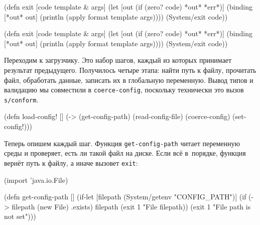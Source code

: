\ifx\DEVICETYPE\MOBILE

\begin{english}
  \begin{clojure}
(defn exit
  [code template & args]
  (let [out (if (zero? code)
              *out*
              *err*)]
    (binding [*out* out]
      (println (apply format
        template args))))
  (System/exit code))
  \end{clojure}
\end{english}

\else

\begin{english}
  \begin{clojure}
(defn exit
  [code template & args]
  (let [out (if (zero? code) *out* *err*)]
    (binding [*out* out]
      (println (apply format template args))))
  (System/exit code))
  \end{clojure}
\end{english}

\fi

Переходим к загрузчику. Это набор шагов, каждый из которых принимает результат
предыдущего. Получилось четыре этапа: найти путь к файлу, прочитать файл,
обработать данные, записать их в глобальную переменную. Вывод типов и валидацию
мы совместили в \verb|coerce-config|, поскольку технически это вызов
\verb|s/conform|.


\begin{english}
  \begin{clojure}
(defn load-config! []
  (-> (get-config-path)
      (read-config-file)
      (coerce-config)
      (set-config!)))
  \end{clojure}
\end{english}

Теперь опишем каждый шаг. Функция \verb|get-config-path| читает переменную
среды и проверяет, есть ли такой файл на диске. Если всё в~порядке, функция
вернёт путь к файлу, а иначе вызовет \verb|exit|:


\ifx\DEVICETYPE\MOBILE

\begin{english}
  \begin{clojure}
(import 'java.io.File)

(defn get-config-path []
  (if-let [filepath (System/getenv
                      "CONFIG_PATH")]
    (if (-> filepath (new File) .exists)
      filepath
      (exit 1 "File %
        filepath))
    (exit 1 "File path is not set")))
  \end{clojure}
\end{english}


